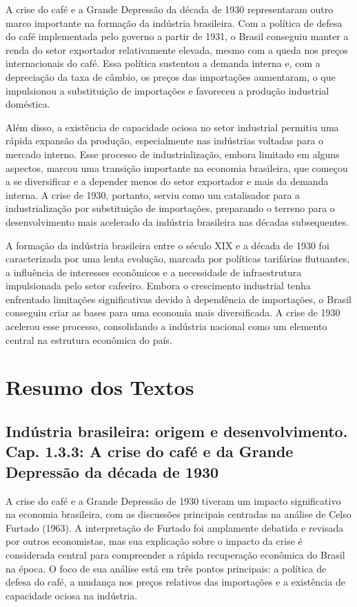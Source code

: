 \documentclass[a4paper,12pt]{article}[abntex2]
\begin{document}
A crise do café e a Grande Depressão da década de 1930 representaram outro marco importante na formação da indústria brasileira. Com a política de defesa do café implementada pelo governo a partir de 1931, o Brasil conseguiu manter a renda do setor exportador relativamente elevada, mesmo com a queda nos preços internacionais do café. Essa política sustentou a demanda interna e, com a depreciação da taxa de câmbio, os preços das importações aumentaram, o que impulsionou a substituição de importações e favoreceu a produção industrial doméstica.

Além disso, a existência de capacidade ociosa no setor industrial permitiu uma rápida expansão da produção, especialmente nas indústrias voltadas para o mercado interno. Esse processo de industrialização, embora limitado em alguns aspectos, marcou uma transição importante na economia brasileira, que começou a se diversificar e a depender menos do setor exportador e mais da demanda interna. A crise de 1930, portanto, serviu como um catalisador para a industrialização por substituição de importações, preparando o terreno para o desenvolvimento mais acelerado da indústria brasileira nas décadas subsequentes.

A formação da indústria brasileira entre o século XIX e a década de 1930 foi caracterizada por uma lenta evolução, marcada por políticas tarifárias flutuantes, a influência de interesses econômicos e a necessidade de infraestrutura impulsionada pelo setor cafeeiro. Embora o crescimento industrial tenha enfrentado limitações significativas devido à dependência de importações, o Brasil conseguiu criar as bases para uma economia mais diversificada. A crise de 1930 acelerou esse processo, consolidando a indústria nacional como um elemento central na estrutura econômica do país.

\newpage
\section{\textbf{Resumo dos Textos}}

\subsection{\textbf{Indústria brasileira: origem e desenvolvimento. Cap. 1.3.3: A crise do café e da Grande Depressão da década de 1930}}

A crise do café e a Grande Depressão de 1930 tiveram um impacto significativo na economia brasileira, com as discussões principais centradas na análise de Celso Furtado (1963). A interpretação de Furtado foi amplamente debatida e revisada por outros economistas, mas sua explicação sobre o impacto da crise é considerada central para compreender a rápida recuperação econômica do Brasil na época. O foco de sua análise está em três pontos principais: a política de defesa do café, a mudança nos preços relativos das importações e a existência de capacidade ociosa na indústria.
\end{document}
